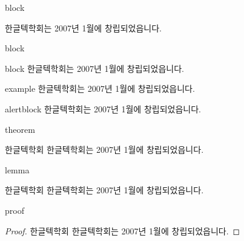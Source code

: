 \documentclass[10pt,xcolor=pdftex,dvipsnames,table,handout]{beamer}
\begin{document}
		\begin{frame}[t]{block}

			\begin{block} {}
			한글텍학회는 2007년 1월에 창립되었읍니다.	
			\end{block}

		\end{frame}


		\begin{frame}[t]{block}

			\begin{block} {block}
			한글텍학회는 2007년 1월에 창립되었읍니다.	
			\end{block}

			\begin{example} {example}
			한글텍학회는 2007년 1월에 창립되었읍니다.	
			\end{example}

			\begin{alertblock} {alertblock}
			한글텍학회는 2007년 1월에 창립되었읍니다.	
			\end{alertblock}

		\end{frame}

		\begin{frame}[t]{theorem}
			\begin{theorem} {한글텍학회}
			한글텍학회는 2007년 1월에 창립되었읍니다.	
			\end{theorem}
		\end{frame}

		\begin{frame}[t]{lemma}

			\begin{lemma} {한글텍학회}
			한글텍학회는 2007년 1월에 창립되었읍니다.	
			\end{lemma}

		\end{frame}


		\begin{frame}[t]{proof}

			\begin{proof}{한글텍학회}
			한글텍학회는 2007년 1월에 창립되었읍니다.	
			\end{proof}

		\end{frame}
\end{document}
